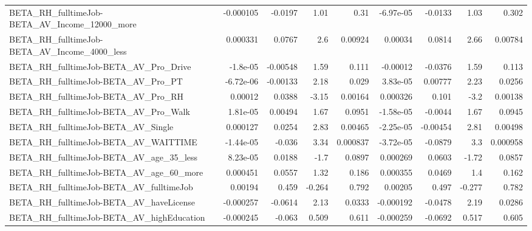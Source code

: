 \begin{tabular}{lrrrrrrrr}
BETA\_RH\_fulltimeJob-BETA\_AV\_Income\_12000\_more      &   -0.000105 &      -0.0197 &      1.01 &     0.31 &  -6.97e-05 &     -0.0133 &         1.03 &         0.302 \\
BETA\_RH\_fulltimeJob-BETA\_AV\_Income\_4000\_less       &    0.000331 &       0.0767 &       2.6 &  0.00924 &    0.00034 &      0.0814 &         2.66 &       0.00784 \\
BETA\_RH\_fulltimeJob-BETA\_AV\_Pro\_Drive              &    -1.8e-05 &     -0.00548 &      1.59 &    0.111 &   -0.00012 &     -0.0376 &         1.59 &         0.113 \\
BETA\_RH\_fulltimeJob-BETA\_AV\_Pro\_PT                 &   -6.72e-06 &     -0.00133 &      2.18 &    0.029 &   3.83e-05 &     0.00777 &         2.23 &        0.0256 \\
BETA\_RH\_fulltimeJob-BETA\_AV\_Pro\_RH                 &     0.00012 &       0.0388 &     -3.15 &  0.00164 &   0.000326 &       0.101 &         -3.2 &       0.00138 \\
BETA\_RH\_fulltimeJob-BETA\_AV\_Pro\_Walk               &    1.81e-05 &      0.00494 &      1.67 &   0.0951 &  -1.58e-05 &     -0.0044 &         1.67 &        0.0945 \\
BETA\_RH\_fulltimeJob-BETA\_AV\_Single                 &    0.000127 &       0.0254 &      2.83 &  0.00465 &  -2.25e-05 &    -0.00454 &         2.81 &       0.00498 \\
BETA\_RH\_fulltimeJob-BETA\_AV\_WAITTIME               &   -1.44e-05 &       -0.036 &      3.34 & 0.000837 &  -3.72e-05 &     -0.0879 &          3.3 &      0.000958 \\
BETA\_RH\_fulltimeJob-BETA\_AV\_age\_35\_less            &    8.23e-05 &       0.0188 &      -1.7 &   0.0897 &   0.000269 &      0.0603 &        -1.72 &        0.0857 \\
BETA\_RH\_fulltimeJob-BETA\_AV\_age\_60\_more            &    0.000451 &       0.0557 &      1.32 &    0.186 &   0.000355 &      0.0469 &          1.4 &         0.162 \\
BETA\_RH\_fulltimeJob-BETA\_AV\_fulltimeJob            &     0.00194 &        0.459 &    -0.264 &    0.792 &    0.00205 &       0.497 &       -0.277 &         0.782 \\
BETA\_RH\_fulltimeJob-BETA\_AV\_haveLicense            &   -0.000257 &      -0.0614 &      2.13 &   0.0333 &  -0.000192 &     -0.0478 &         2.19 &        0.0286 \\
BETA\_RH\_fulltimeJob-BETA\_AV\_highEducation          &   -0.000245 &       -0.063 &     0.509 &    0.611 &  -0.000259 &     -0.0692 &        0.517 &         0.605 \\

\end{tabular}
